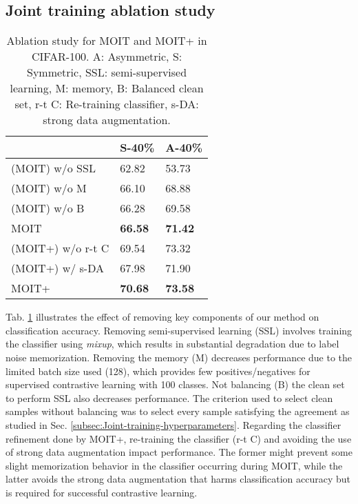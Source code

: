 \documentclass[final]{cvpr}
\begin{document}
\subsection{Joint training ablation study\label{subsec:Joint-training-ablation}}

\begin{table}[t]
\begin{centering}
\caption{\label{tab:AblationJoint}Ablation study for MOIT and MOIT+ in CIFAR-100.
A: Asymmetric, S: Symmetric, SSL: semi-supervised learning, M: memory,
B: Balanced clean set, r-t C: Re-training classifier, s-DA: strong
data augmentation.}
\medskip{}
{\small{}}{\small\par}
\par\end{centering}
\centering{}{\small{}}\begin{tabularx}{\columnwidth}{Xll}
\toprule 
 & {\small{}S-40\%} & {\small{}A-40\%}\tabularnewline
\midrule 
{\small{}(MOIT) w/o SSL} & {\small{}62.82} & {\small{}53.73}\tabularnewline

{\small{}(MOIT) w/o M} & {\small{}66.10} & {\small{}68.88}\tabularnewline

{\small{}(MOIT) w/o B} & {\small{}66.28} & {\small{}69.58}\tabularnewline

{\small{}MOIT} & \textbf{\small{}66.58} & \textbf{\small{}71.42}\tabularnewline
\midrule
{\small{}(MOIT+) w/o r-t C} & {\small{}69.54} & {\small{}73.32}\tabularnewline

{\small{}(MOIT+) w/ s-DA} & {\small{}67.98} & {\small{}71.90}\tabularnewline

{\small{}MOIT+} & \textbf{\small{}70.68} & \textbf{\small{}73.58}\tabularnewline
\bottomrule
\end{tabularx}{\small{}}{\small\par}
\end{table}
Tab. \ref{tab:AblationJoint} illustrates the effect of removing key components of our method on classification accuracy. Removing semi-supervised learning (SSL) involves training the classifier using \textit{mixup}, which results in substantial degradation due to label noise memorization. Removing the memory (M) decreases performance due to the limited batch size used (128), which provides few positives/negatives for supervised contrastive learning with 100 classes. Not balancing (B) the clean set  to perform SSL also decreases performance. The criterion used to select clean samples without balancing was to select every sample  satisfying the agreement  as studied in Sec. \ref{subsec:Joint-training-hyperparameters}. Regarding the classifier refinement done by MOIT+, re-training the classifier (r-t C) and avoiding the use of strong data augmentation impact performance. The former might prevent some slight memorization behavior in the classifier occurring during MOIT, while the latter avoids the strong data augmentation that harms classification accuracy but is required for successful contrastive learning. 
\end{document}
